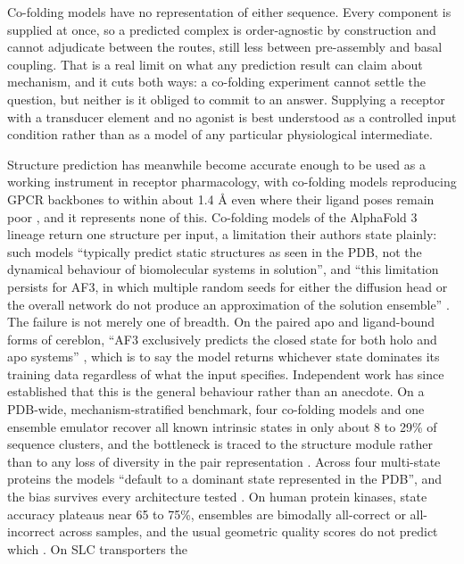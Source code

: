 Co-folding models have no representation of either sequence. Every component is supplied at once,
so a predicted complex is order-agnostic by construction and cannot adjudicate between the routes,
still less between pre-assembly and basal coupling. That is a real limit on what any prediction
result can claim about mechanism, and it cuts both ways: a co-folding experiment cannot settle the
question, but neither is it obliged to commit to an answer. Supplying a receptor with a transducer
element and no agonist is best understood as a controlled input condition rather than as a model of
any particular physiological intermediate.

Structure prediction has meanwhile become accurate enough to be used as a working instrument in
receptor pharmacology, with co-folding models reproducing GPCR backbones to within about 1.4 \AA{} even
where their ligand poses remain poor \citep{zhang2026generalization}, and it represents none of this. Co-folding models of the AlphaFold 3 lineage
return one structure per input, a limitation their authors state plainly: such models ``typically
predict static structures as seen in the PDB, not the dynamical behaviour of biomolecular systems
in solution'', and ``this limitation persists for AF3, in which multiple random seeds for either the
diffusion head or the overall network do not produce an approximation of the solution ensemble''
\citep[p.~498]{abramson2024af3}. The failure is not merely one of breadth. On the paired apo and ligand-bound
forms of cereblon, ``AF3 exclusively predicts the closed state for both holo and apo systems''
\citep[p.~498]{abramson2024af3}, which is to say the model returns whichever state dominates its training
data regardless of what the input specifies. Independent work has since established that this is
the general behaviour rather than an anecdote. On a PDB-wide, mechanism-stratified benchmark, four
co-folding models and one ensemble emulator recover all known intrinsic states in only about 8 to
29\% of sequence clusters, and the bottleneck is traced to the structure module rather than to any
loss of diversity in the pair representation \citep{ku2026promise}. Across four multi-state proteins the
models ``default to a dominant state represented in the PDB'', and the bias survives every
architecture tested \citep[p.~2]{ye2026multistatebias}. On human protein kinases, state accuracy plateaus
near 65 to 75\%, ensembles are bimodally all-correct or all-incorrect across samples, and the usual
geometric quality scores do not predict which \citep{sun2026kinconfbench}. On SLC transporters the
